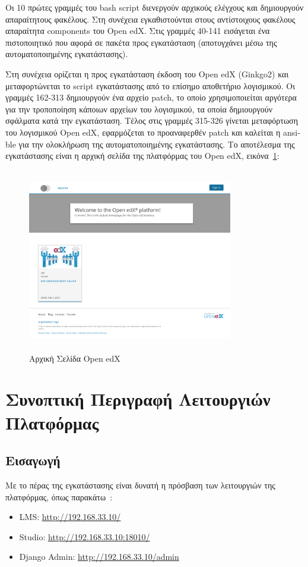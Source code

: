 \documentclass[12pt]{report}
\begin{document}
Οι 10 πρώτες γραμμές του \textlatin{bash script} διενεργούν αρχικούς ελέγχους και δημιουργούν απαραίτητους φακέλους. Στη συνέχεια εγκαθιστούνται στους αντίστοιχους φακέλους απαραίτητα \textlatin{components} του \textlatin{Open edX}. Στις γραμμές 40-141 εισάγεται ένα πιστοποιητικό που αφορά σε πακέτα προς εγκατάσταση (αποτυγχάνει μέσω της αυτοματοποιημένης εγκατάστασης).

Στη συνέχεια ορίζεται η προς εγκατάσταση έκδοση του \textlatin{Open edX (Ginkgo2)} και μεταφορτώνεται το \textlatin{script} εγκατάστασης από το επίσημο αποθετήριο λογισμικού. Οι γραμμές 162-313 δημιουργούν ένα αρχείο \textlatin{patch}, το οποίο χρησιμοποιείται αργότερα για την τροποποίηση κάποιων αρχείων του λογισμικού, τα οποία δημιουργούν σφάλματα κατά την εγκατάσταση. Τέλος στις γραμμές 315-326 γίνεται μεταφόρτωση του λογισμικού \textlatin{Open edX}, εφαρμόζεται το προαναφερθέν \textlatin{patch} και καλείται η \textlatin{ansible} για την ολοκλήρωση της αυτοματοποιημένης εγκατάστασης. Το αποτέλεσμα της εγκατάστασης είναι η αρχική σελίδα της πλατφόρμας του \textlatin{Open edX}, εικόνα~\ref{fig:edx_landing}:
\begin{figure}[!htbp]
\centering
\includegraphics[width=0.8\textwidth, height=8cm]{openedx-start}
\caption{Αρχική Σελίδα \textlatin{Open edX}}
\label{fig:edx_landing}
\end{figure}

\section{Συνοπτική Περιγραφή Λειτουργιών Πλατφόρμας}
\subsection{Εισαγωγή}\label{edx_intro}
Με το πέρας της εγκατάστασης είναι δυνατή η πρόσβαση των λειτουργιών της πλατφόρμας, όπως παρακάτω~\cite{confluence_1}:
\begin{itemize}
  \item \textlatin{LMS: \url{http://192.168.33.10/}}
  \item \textlatin{Studio: \url{http://192.168.33.10:18010/}}
  \item \textlatin{Django Admin: \url{http://192.168.33.10/admin}}
\end{itemize}
\end{document}
